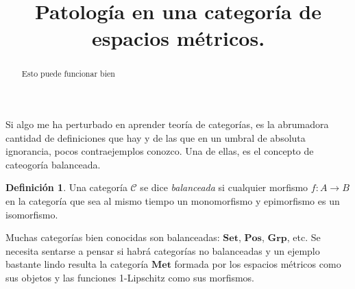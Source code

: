 \documentclass[draft,letter,10pt,notitlepage]{amsart}
\title{Patología en una categoría de espacios métricos.}
\date{}
\theoremstyle{definition}
\newtheorem*{definition}{Definición}
\theoremstyle{remark}
\begin{document}
\maketitle
\begin{abstract}
  Esto puede funcionar bien
\end{abstract}

Si algo me ha perturbado en aprender teoría de categorías, es 
la abrumadora cantidad de definiciones que hay y de las que
en un umbral de absoluta ignorancia, pocos contraejemplos
conozco. Una de ellas, es el concepto de cateogoría balanceada.

\begin{definition}
  Una categoría \( \mathcal{C}\) se dice \emph{balanceada}
  si cualquier morfismo \( f \colon A \to B\) en la categoría
  que sea al mismo tiempo un monomorfismo y epimorfismo
  es un isomorfismo.
\end{definition}

Muchas categorías bien conocidas son balanceadas: \( \mathbf{Set}\),
\( \mathbf{Pos}\), \( \mathbf{Grp}\), etc. Se necesita sentarse
a pensar si habrá categorías no balanceadas y un ejemplo bastante
lindo resulta la categoría \( \mathbf{Met}\) formada por
los espacios métricos como sus objetos y las funciones
1-Lipschitz como sus morfismos.
\end{document}
